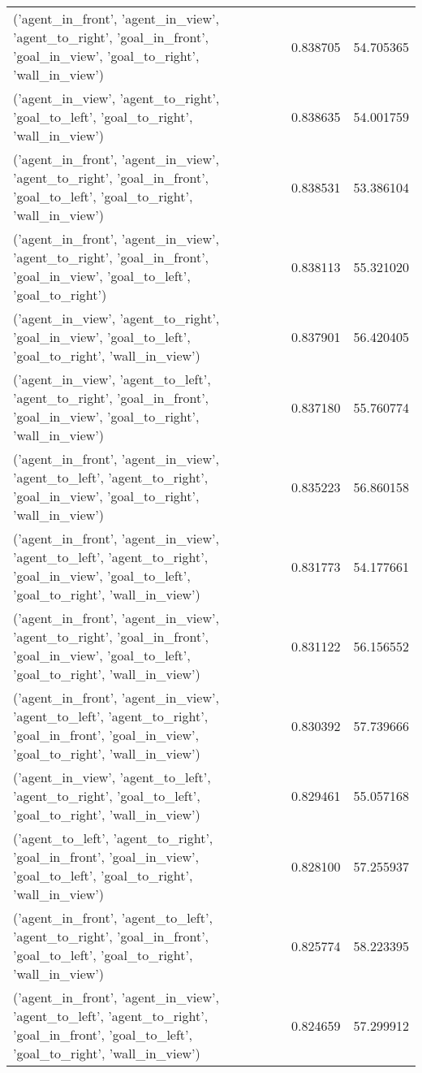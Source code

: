 \begin{tabular}{lrr}
('agent\_in\_front', 'agent\_in\_view', 'agent\_to\_right', 'goal\_in\_front', 'goal\_in\_view', 'goal\_to\_right', 'wall\_in\_view') & 0.838705 & 54.705365 \\
('agent\_in\_view', 'agent\_to\_right', 'goal\_to\_left', 'goal\_to\_right', 'wall\_in\_view') & 0.838635 & 54.001759 \\
('agent\_in\_front', 'agent\_in\_view', 'agent\_to\_right', 'goal\_in\_front', 'goal\_to\_left', 'goal\_to\_right', 'wall\_in\_view') & 0.838531 & 53.386104 \\
('agent\_in\_front', 'agent\_in\_view', 'agent\_to\_right', 'goal\_in\_front', 'goal\_in\_view', 'goal\_to\_left', 'goal\_to\_right') & 0.838113 & 55.321020 \\
('agent\_in\_view', 'agent\_to\_right', 'goal\_in\_view', 'goal\_to\_left', 'goal\_to\_right', 'wall\_in\_view') & 0.837901 & 56.420405 \\
('agent\_in\_view', 'agent\_to\_left', 'agent\_to\_right', 'goal\_in\_front', 'goal\_in\_view', 'goal\_to\_right', 'wall\_in\_view') & 0.837180 & 55.760774 \\
('agent\_in\_front', 'agent\_in\_view', 'agent\_to\_left', 'agent\_to\_right', 'goal\_in\_view', 'goal\_to\_right', 'wall\_in\_view') & 0.835223 & 56.860158 \\
('agent\_in\_front', 'agent\_in\_view', 'agent\_to\_left', 'agent\_to\_right', 'goal\_in\_view', 'goal\_to\_left', 'goal\_to\_right', 'wall\_in\_view') & 0.831773 & 54.177661 \\
('agent\_in\_front', 'agent\_in\_view', 'agent\_to\_right', 'goal\_in\_front', 'goal\_in\_view', 'goal\_to\_left', 'goal\_to\_right', 'wall\_in\_view') & 0.831122 & 56.156552 \\
('agent\_in\_front', 'agent\_in\_view', 'agent\_to\_left', 'agent\_to\_right', 'goal\_in\_front', 'goal\_in\_view', 'goal\_to\_right', 'wall\_in\_view') & 0.830392 & 57.739666 \\
('agent\_in\_view', 'agent\_to\_left', 'agent\_to\_right', 'goal\_to\_left', 'goal\_to\_right', 'wall\_in\_view') & 0.829461 & 55.057168 \\
('agent\_to\_left', 'agent\_to\_right', 'goal\_in\_front', 'goal\_in\_view', 'goal\_to\_left', 'goal\_to\_right', 'wall\_in\_view') & 0.828100 & 57.255937 \\
('agent\_in\_front', 'agent\_to\_left', 'agent\_to\_right', 'goal\_in\_front', 'goal\_to\_left', 'goal\_to\_right', 'wall\_in\_view') & 0.825774 & 58.223395 \\
('agent\_in\_front', 'agent\_in\_view', 'agent\_to\_left', 'agent\_to\_right', 'goal\_in\_front', 'goal\_to\_left', 'goal\_to\_right', 'wall\_in\_view') & 0.824659 & 57.299912 \\

\end{tabular}
